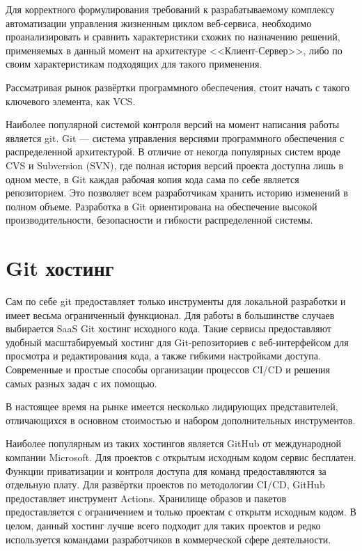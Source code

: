 Для корректного формулирования требований к разрабатываемому комплексу автоматизации управления жизненным циклом веб-сервиса,
необходимо проанализировать и сравнить характеристики схожих по назначению решений, применяемых в данный момент на архитектуре <<Клиент-Сервер>>,
либо по своим характеристикам подходящих для такого применения.

Рассматривая рынок развёртки программного обеспечения, стоит начать с такого ключевого элемента, как VCS.

Наиболее популярной системой контроля версий на момент написания работы является git\cite{web:git:book}.
Git --- система управления версиями программного обеспечения с распределенной архитектурой.
В отличие от некогда популярных систем вроде CVS и Subversion (SVN),
где полная история версий проекта доступна лишь в одном месте,
в Git каждая рабочая копия кода сама по себе является репозиторием.
Это позволяет всем разработчикам хранить историю изменений в полном объеме.
Разработка в Git ориентирована на обеспечение высокой производительности, безопасности и гибкости распределенной системы.

\section{Git хостинг}

Сам по себе git предоставляет только инструменты для локальной разработки и имеет весьма ограниченный функционал.
Для работы в большинстве случаев выбирается SaaS Git хостинг исходного кода.
Такие сервисы предоставляют удобный масштабируемый хостинг для Git-репозиториев с веб-интерфейсом для просмотра и редактирования кода,
а также гибкими настройками доступа.
Современные и простые способы организации процессов CI/CD и решения самых разных задач с их помощью.

В настоящее время на рынке имеется несколько лидирующих представителей, отличающихся в основном стоимостью и набором дополнительных инструментов\cite{web:git-reps:rating}.

Наиболее популярным из таких хостингов является GitHub от международной компании Microsoft.
Для проектов с открытым исходным кодом сервис бесплатен.
Функции приватизации и контроля доступа для команд предоставляются за отдельную плату.
Для развёртки проектов по методологии CI/CD, GitHub предоставляет инструмент Actions.
Хранилище образов и пакетов предоставляется с ограничением и только проектам с открытм исходным кодом.
В целом, данный хостинг лучше всего подходит для таких проектов и редко используется командами разработчиков в коммерческой сфере деятельности.

